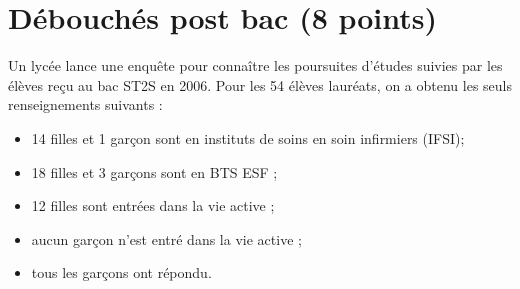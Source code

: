 \section{Débouchés post bac (8 points)}

Un lycée lance une enquête pour connaître les poursuites d'études suivies par les élèves reçu au bac ST2S en 2006.
Pour les 54 élèves lauréats, on a obtenu les seuls renseignements suivants :
\begin{itemize}
	\item 14 filles et 1 garçon sont en instituts de soins en soin infirmiers (IFSI);
	\item 18 filles et 3 garçons sont en BTS ESF ;
	\item 12 filles sont entrées dans la vie active ;
	\item aucun garçon n'est entré dans la vie active ;
	\item tous les garçons ont répondu.
\end{itemize}

